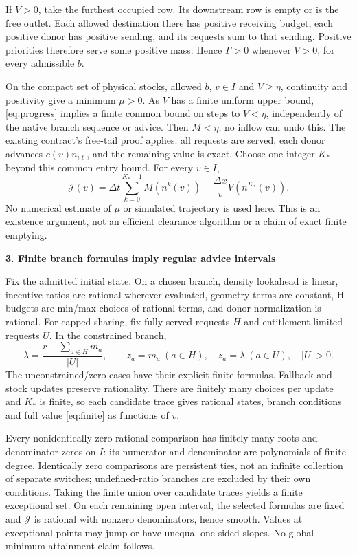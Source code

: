 \documentclass[10pt,a4paper]{article}
\newcommand{\head}[1]{\par\medskip\textbf{#1}\par}
\begin{document}
If $V>0$, take the furthest occupied row. Its downstream row is empty or
is the free outlet. Each allowed destination there has positive receiving
budget, each positive donor has positive sending, and its requests sum to
that sending. Positive priorities therefore serve some positive mass.
Hence $\Gamma>0$ whenever $V>0$, for every admissible $b$.

On the compact set of physical stocks, allowed $b$, $v\in I$ and $V\geq\eta$,
continuity and positivity give a minimum $\mu>0$. As $V$ has a finite uniform
upper bound, \eqref{eq:progress} implies a finite common bound on steps to
$V<\eta$, independently of the native branch sequence or advice. Then
$M<\eta$; no inflow can undo this. The existing contract's free-tail proof
applies: all requests are served, each donor advances $c(v)n_{i\ell}$, and
the remaining value is exact. Choose one integer $K_*$ beyond this common
entry bound. For every $v\in I$,
\begin{equation}
 \mathcal J(v)=\Delta t\sum_{k=0}^{K_*-1}M(n^k(v))
              +\frac{\Delta x}{v}V(n^{K_*}(v)).
 \label{eq:finite}
\end{equation}
No numerical estimate of $\mu$ or simulated trajectory is used here. This
is an existence argument, not an efficient clearance algorithm or a claim
of exact finite emptying.

\newpage
\head{3. Finite branch formulas imply regular advice intervals}
Fix the admitted initial state. On a chosen branch, density lookahead is
linear, incentive ratios are rational wherever evaluated, geometry terms
are constant, H budgets are min/max choices of rational terms, and donor
normalization is rational. For capped sharing, fix fully served requests
$H$ and entitlement-limited requests $U$. In the constrained branch,
\begin{equation}
 \lambda=\frac{r-\sum_{a\in H}m_a}{|U|},\qquad
 z_a=m_a\ (a\in H),\quad z_a=\lambda\ (a\in U),\quad |U|>0.
 \label{eq:sharing}
\end{equation}
The unconstrained/zero cases have their explicit finite formulas. Fallback
and stock updates preserve rationality. There are finitely many choices per
update and $K_*$ is finite, so each candidate trace gives rational states,
branch conditions and full value \eqref{eq:finite} as functions of $v$.

Every nonidentically-zero rational comparison has finitely many roots and
denominator zeros on $I$: its numerator and denominator are polynomials of
finite degree. Identically zero comparisons are persistent ties, not an
infinite collection of separate switches; undefined-ratio branches are
excluded by their own conditions. Taking the finite union over candidate
traces yields a finite exceptional set. On each remaining open interval,
the selected formulas are fixed and $\mathcal J$ is rational with nonzero
denominators, hence smooth. Values at exceptional points may jump or have
unequal one-sided slopes. No global minimum-attainment claim follows.
\end{document}
